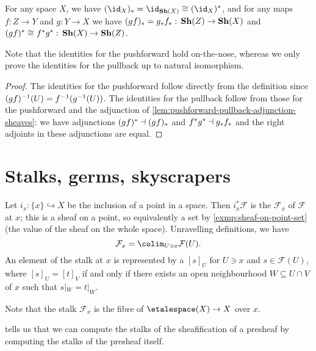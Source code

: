 \begin{cor}\label{cor:pushforward-pullback-functorial-in-map}
For any space \(X\), we have \((\id_X)_*=\id_{\catSheaf(X)}\cong(\id_X)^*\), and for any maps \(f\colon Z\to Y\) and \(g\colon Y\to X\) we have \((gf)_*=g_*f_*\colon\catSheaf(Z)\to\catSheaf(X)\) and \((gf)^*\cong f^*g^*\colon\catSheaf(X)\to\catSheaf(Z)\).
\end{cor}
Note that the identities for the pushforward hold on-the-nose, whereas we only prove the identities for the pullback up to natural isomorphism.
\begin{proof}
The identities for the pushforward follow directly from the definition since \((gf)^{-1}(U)=f^{-1}(g^{-1}(U))\).
The identities for the pullback follow from those for the pushforward and the adjunction of \cref{lem:pushforward-pullback-adjunction-sheaves}: we have adjunctions \((gf)^*\dashv(gf)_*\) and \(f^*g^*\dashv g_*f_*\) and the right adjoints in these adjunctions are equal.
\end{proof}

\section{Stalks, germs, skyscrapers}

\begin{defn}\label{defn:stalk}
Let $i_x\colon \{x\} \hookrightarrow X$ be the inclusion of a point in a space.
Then $i_x^* \mathcal{F}$ is the  $\mathcal{F}_x$ of $\mathcal{F}$ at $x$; this is a sheaf on a point, so equivalently a set by \cref{exmp:sheaf-on-point-set} (the value of the sheaf on the whole space).
Unravelling definitions, we have \[
    \mathcal{F}_x = \colim_{U \ni x} \mathcal{F}(U)\text{.}
\]
An element of the stalk at $x$ is represented by a  $[s]_U$ for $U \ni x$ and $s \in \mathcal{F}(U)$, where \([s]_U = [t]_V\) if and only if there exists an open neighbourhood \(W\subseteq U\cap V\) of \(x\) such that \(s|_W=t|_W\).
\end{defn}
Note that the stalk $\mathcal{F}_x$ is the fibre of $\etalespace(X) \to X$ over $x$.

\begin{rmk}
 tells us that we can compute the stalks of the sheafification of a presheaf by computing the stalks of the presheaf itself.
\end{rmk}

